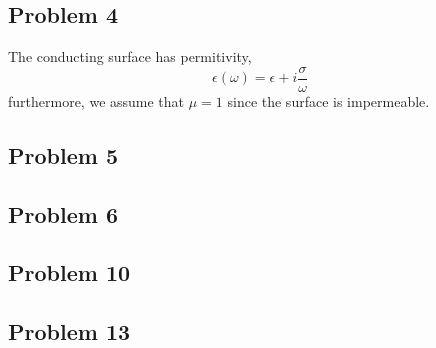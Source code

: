 \documentclass[12pt]{extarticle}
\theoremstyle{definition}
\begin{document}
\subsection{Problem 4}

The conducting surface has permitivity,
\[ \epsilon(\omega) = \epsilon + i \frac{\sigma}{\omega} \]
furthermore, we assume that $\mu = 1$ since the surface is impermeable. 

\subsection{Problem 5}

\subsection{Problem 6}

\subsection{Problem 10}

\subsection{Problem 13}
\end{document}
